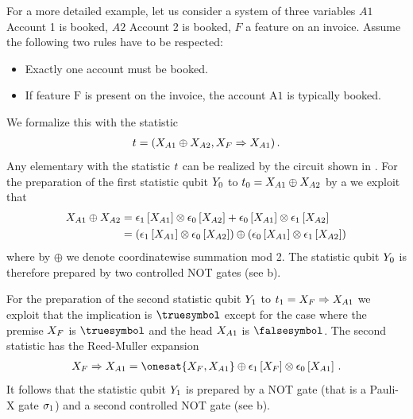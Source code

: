 \begin{example}
    \label{exa:toyAccounting}
    For a more detailed example, let us consider a system of three variables $A1$ Account 1 is booked, $A2$ Account 2 is booked, $F$ a feature on an invoice.
    Assume the following two rules have to be respected:
    \begin{itemize}
        \item \textcolor{\concolor}{Exactly one account must be booked.}
        \item \textcolor{\probcolor}{If feature $\mathrm{F}$ is present on the invoice, the account $\mathrm{A1}$ is typically booked.}
    \end{itemize}
    We formalize this with the statistic
    \begin{align*}
        t = (X_{A1} \oplus X_{A2}, X_{F}\Rightarrow X_{A1})\, .
    \end{align*}
    Any elementary \ComputationActivationNetwork{} with the statistic $t$ can be realized by the circuit shown in .
    For the preparation of the first statistic qubit $Y_{0}$ to $t_{0}=X_{A1} \oplus X_{A2}$ by a \computationCircuit{} we exploit that
    \begin{align*}
        X_{A1}\oplus X_{A2}
        &= \epsilon_{1}\left[X_{A1}\right] \otimes \epsilon_{0}\left[X_{A2}\right]
        + \epsilon_{0}\left[X_{A1}\right] \otimes \epsilon_{1}\left[X_{A2}\right] \\
        &= \left(\epsilon_{1}\left[X_{A1}\right] \otimes \epsilon_{0}\left[X_{A2}\right]\right)
        \oplus \left(\epsilon_{0}\left[X_{A1}\right] \otimes \epsilon_{1}\left[X_{A2}\right]\right)
    \end{align*}
    where by $\oplus$ we denote coordinatewise summation mod 2.
    The statistic qubit $Y_{0}$ is therefore prepared by two controlled NOT gates (see b).

    For the preparation of the second statistic qubit $Y_{1}$ to $t_{1}=X_{F}\Rightarrow X_{A1}$ we exploit that the implication is $\truesymbol$ except for the case where the premise $X_{F}$ is $\truesymbol$ and the head $X_{A1}$ is $\falsesymbol$.
    The second statistic has the Reed-Muller expansion
    \begin{align*}
        \catvariableof{F}\Rightarrow \catvariableof{A1}
        = \onesat{\catvariableof{F},\catvariableof{A1}} \oplus \onehotmapofat{1}{\catvariableof{F}} \otimes \onehotmapofat{0}{\catvariableof{A1}}\, .
    \end{align*}
    It follows that the statistic qubit $Y_{1}$ is prepared by a NOT gate (that is a Pauli-X gate $\sigma_1$) and a second controlled NOT gate (see b).


\end{example}
